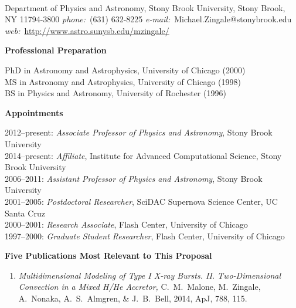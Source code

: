 \documentclass[11pt,letterpaper,english]{article}
\begin{document}
\setlength{\parindent}{0in} %

\pagestyle{fancy}   \renewcommand{%
\headrulewidth}{0.0pt}



\\
{Department of Physics and Astronomy, Stony Brook University, Stony
  Brook, NY 11794-3800} \smallskip
{{\it phone:}~(631) 632-8225 \hskip 2mm
{\it e-mail:}~Michael.Zingale@stonybrook.edu \hskip 2mm \\[-0.25em]
{\it web:}~\url{http://www.astro.sunysb.edu/mzingale/}}

\begin{flushleft} {\bf Professional Preparation}
{\parindent 16pt

PhD in Astronomy and Astrophysics, University of Chicago (2000)\\ 
MS in Astronomy and Astrophysics, University of Chicago (1998)\\ 
BS in Physics and Astronomy, University of Rochester (1996)\\ 
}

\vspace{.04in}
{\bf Appointments}
{\parindent 16pt

2012--present: {\em Associate Professor of Physics and Astronomy}, Stony Brook University \\ 
2014--present: {\em Affiliate}, Institute for Advanced Computational Science, Stony Brook University \\ 
2006--2011:  {\em Assistant Professor of Physics and Astronomy}, Stony Brook University \\ 
2001--2005: {\em Postdoctoral Researcher}, SciDAC Supernova Science Center, UC Santa Cruz \\
2000--2001: {\em Research Associate}, Flash Center, University of Chicago \\
1997--2000: {\em Graduate Student Researcher}, Flash Center, University of Chicago 
}

\vspace{.04in}
{\bf Five Publications Most Relevant to This Proposal}
\vspace{-6pt}
\begin{enumerate} \itemsep1pt \parskip0pt 
\item {\it Multidimensional Modeling of Type I X-ray
  Bursts. II. Two-Dimensional Convection in a Mixed H/He Accretor, }
  C.~M.~Malone, M.~Zingale, A.~Nonaka, A.~S.~Almgren, \& J.~B.~Bell,
  2014, ApJ, 788, 115.


\end{enumerate}
\end{flushleft}
\end{document}
